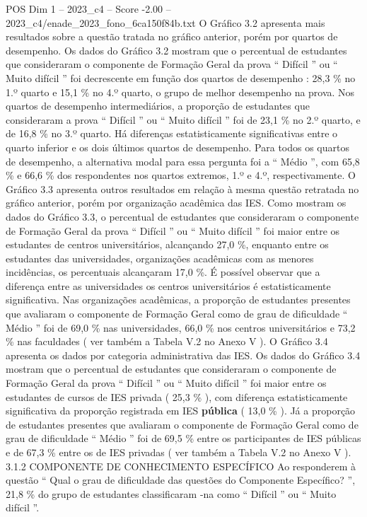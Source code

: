 \begin{textsample}{POS Dim 1 – 2023\_c4 – Score -2.00 – 2023\_c4/enade\_2023\_fono\_6ca150f84b.txt}
O Gráfico 3.2 apresenta mais resultados sobre a questão tratada no gráfico anterior, porém por quartos de desempenho.
Os dados do Gráfico 3.2 mostram que o percentual de estudantes que consideraram o componente de Formação Geral da prova “ Difícil ” ou “ Muito difícil ” foi decrescente em função dos quartos de desempenho : 28,3 \% no 1.º quarto e 15,1 \% no 4.º quarto, o grupo de melhor desempenho na prova.
Nos quartos de desempenho intermediários, a proporção de estudantes que consideraram a prova “ Difícil ” ou “ Muito difícil ” foi de 23,1 \% no 2.º quarto, e de 16,8 \% no 3.º quarto.
Há diferenças estatisticamente significativas entre o quarto inferior e os dois últimos quartos de desempenho.
Para todos os quartos de desempenho, a alternativa modal para essa pergunta foi a “ Médio ”, com 65,8 \% e 66,6 \% dos respondentes nos quartos extremos, 1.º e 4.º, respectivamente.
O Gráfico 3.3 apresenta outros resultados em relação à mesma questão retratada no gráfico anterior, porém por organização acadêmica das IES.
Como mostram os dados do Gráfico 3.3, o percentual de estudantes que consideraram o componente de Formação Geral da prova “ Difícil ” ou “ Muito difícil ” foi maior entre os estudantes de centros universitários, alcançando 27,0 \%, enquanto entre os estudantes das universidades, organizações acadêmicas com as menores incidências, os percentuais alcançaram 17,0 \%.
É possível observar que a diferença entre as universidades os centros universitários é estatisticamente significativa.
Nas organizações acadêmicas, a proporção de estudantes presentes que avaliaram o componente de Formação Geral como de grau de dificuldade “ Médio ” foi de 69,0 \% nas universidades, 66,0 \% nos centros universitários e 73,2 \% nas faculdades ( ver também a Tabela V.2 no Anexo V ).
O Gráfico 3.4 apresenta os dados por categoria administrativa das IES.
Os dados do Gráfico 3.4 mostram que o percentual de estudantes que consideraram o componente de Formação Geral da prova “ Difícil ” ou “ Muito difícil ” foi maior entre os estudantes de cursos de IES privada ( 25,3 \% ), com diferença estatisticamente significativa da proporção registrada em IES \textbf{pública} ( 13,0 \% ).
Já a proporção de estudantes presentes que avaliaram o componente de Formação Geral como de grau de dificuldade “ Médio ” foi de 69,5 \% entre os participantes de IES públicas e de 67,3 \% entre os de IES privadas ( ver também a Tabela V.2 no Anexo V ). 3.1.2 COMPONENTE DE CONHECIMENTO ESPECÍFICO Ao responderem à questão “ Qual o grau de dificuldade das questões do Componente Específico? ”, 21,8 \% do grupo de estudantes classificaram -na como “ Difícil ” ou “ Muito difícil ”.

\end{textsample}
